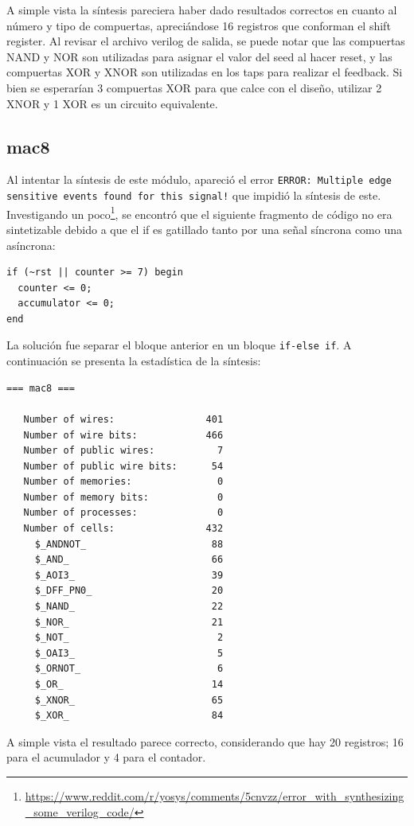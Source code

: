 \documentclass[letterpaper, 12pt]{article}
\numberwithin{equation}{section}
\begin{document}
A simple vista la síntesis pareciera haber dado resultados correctos en cuanto al número y tipo de compuertas, apreciándose 16 registros que conforman el shift register. Al revisar el archivo verilog de salida, se puede notar que las compuertas NAND y NOR son utilizadas para asignar el valor del seed al hacer reset, y las compuertas XOR y XNOR son utilizadas en los taps para realizar el feedback. Si bien se esperarían 3 compuertas XOR para que calce con el diseño, utilizar 2 XNOR y 1 XOR es un circuito equivalente.

\subsection{mac8}

Al intentar la síntesis de este módulo, apareció el error \texttt{ERROR: Multiple edge sensitive events found for this signal!} que impidió la síntesis de este. Investigando un poco\footnote{\url{https://www.reddit.com/r/yosys/comments/5cnvzz/error_with_synthesizing_some_verilog_code/}}, se encontró que el siguiente fragmento de código no era sintetizable debido a que el if es gatillado tanto por una señal síncrona como una asíncrona:

\begin{verbatim}
if (~rst || counter >= 7) begin
  counter <= 0;
  accumulator <= 0;
end
\end{verbatim}

La solución fue separar el bloque anterior en un bloque \texttt{if-else if}. A continuación se presenta la estadística de la síntesis:

\begin{verbatim}
=== mac8 ===

   Number of wires:                401
   Number of wire bits:            466
   Number of public wires:           7
   Number of public wire bits:      54
   Number of memories:               0
   Number of memory bits:            0
   Number of processes:              0
   Number of cells:                432
     $_ANDNOT_                      88
     $_AND_                         66
     $_AOI3_                        39
     $_DFF_PN0_                     20
     $_NAND_                        22
     $_NOR_                         21
     $_NOT_                          2
     $_OAI3_                         5
     $_ORNOT_                        6
     $_OR_                          14
     $_XNOR_                        65
     $_XOR_                         84
\end{verbatim}

A simple vista el resultado parece correcto, considerando que hay 20 registros; 16 para el acumulador y 4 para el contador.
\end{document}
